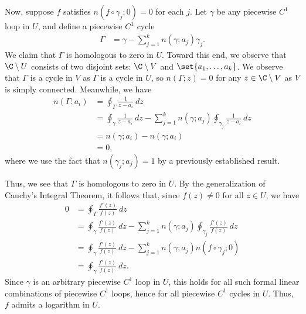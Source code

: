 \documentclass[10pt]{mypackage}
\begin{document}
\begin{solution}
\begin{enumerate}[(a)]
      Now, suppose $f$ satisfies $n\left( f\circ\gamma_j;0 \right) = 0$ for each $j$. Let $\gamma$ be any piecewise $C^{1}$ loop in $U$, and define a piecewise $C^{1}$ cycle
      \begin{align*}
        \Gamma &= \gamma - \sum_{j=1}^{k}n\left( \gamma;a_j \right) \gamma_j.
      \end{align*}
      We claim that $\Gamma$ is homologous to zero in $U$. Toward this end, we observe that $\C\setminus U$ consists of two disjoint sets: $\C\setminus V$ and $\set{a_1,\dots,a_k}$. We observe that $\Gamma$ is a cycle in $V$ as $\Gamma$ is a cycle in $U$, so $n\left( \Gamma;z \right) = 0$ for any $z\in\C\setminus V$ as $V$ is simply connected. Meanwhile, we have
      \begin{align*}
        n\left( \Gamma;a_i \right) &= \oint_{\Gamma}^{} \frac{1}{z-a_i}\:dz\\
                                   &= \oint_{\gamma}^{} \frac{1}{z-a_i}\:dz - \sum_{j=1}^{k} n\left( \gamma;a_j \right)\oint_{\gamma_j}^{} \frac{1}{z-a_i}\:dz\\
                                   &= n\left( \gamma;a_i \right) - n\left( \gamma;a_i \right)\\
                                   &= 0,
      \end{align*}
      where we use the fact that $n\left( \gamma_j;a_j \right) = 1$ by a previously established result.\newline

      Thus, we see that $\Gamma$ is homologous to zero in $U$. By the generalization of Cauchy's Integral Theorem, it follows that, since $f(z)\neq 0$ for all $z\in U$, we have
      \begin{align*}
        0 &= \oint_{\Gamma}^{} \frac{f'(z)}{f(z)}\:dz\\
          &= \oint_{\gamma}^{} \frac{f'(z)}{f(z)}\:dz - \sum_{j=1}^{k} n\left( \gamma;a_j \right) \oint_{\gamma_j}^{} \frac{f'(z)}{f(z)}\:dz\\
          &= \oint_{\gamma}^{} \frac{f'(z)}{f(z)}\:dz - \sum_{j=1}^{k} n\left( \gamma;a_j \right)n\left( f\circ\gamma_j;0 \right)\\
          &= \oint_{\gamma}^{} \frac{f'(z)}{f(z)}\:dz.
      \end{align*}
      Since $\gamma$ is an arbitrary piecewise $C^{1}$ loop in $U$, this holds for all such formal linear combinations of piecewise $C^{1}$ loops, hence for all piecewise $C^{1}$ cycles in $U$. Thus, $f$ admits a logarithm in $U$.
  \end{enumerate}
\end{solution}
\end{document}

